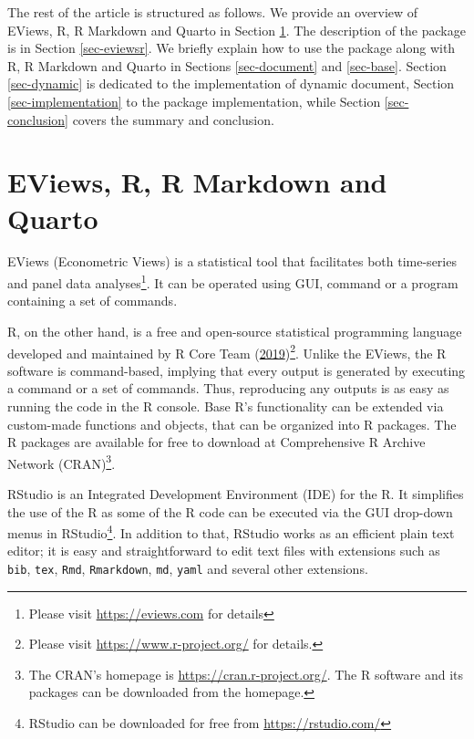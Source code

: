 The rest of the article is structured as follows. We provide an overview of EViews, R, R Markdown and Quarto in Section \ref{sec-tools}. The description of the  package is in Section \ref{sec-eviewsr}. We briefly explain how to use the package along with R, R Markdown and Quarto in Sections \ref{sec-document} and \ref{sec-base}. Section \ref{sec-dynamic} is dedicated to the implementation of dynamic document, Section \ref{sec-implementation} to the package implementation, while Section \ref{sec-conclusion} covers the summary and conclusion.

\hypertarget{sec-tools}{%
\section{EViews, R, R Markdown and Quarto}\label{sec-tools}}

EViews (Econometric Views) is a statistical tool that facilitates both time-series and panel data analyses\footnote{Please visit \url{https://eviews.com} for details}. It can be operated using GUI, command or a program containing a set of commands.

R, on the other hand, is a free and open-source statistical programming language developed and maintained by R Core Team (\protect\hyperlink{ref-R}{2019})\footnote{Please visit \url{https://www.r-project.org/} for details.}. Unlike the EViews, the R software is command-based, implying that every output is generated by executing a command or a set of commands. Thus, reproducing any outputs is as easy as running the code in the R console. Base R's functionality can be extended via custom-made functions and objects, that can be organized into R packages. The R packages are available for free to download at Comprehensive R Archive Network (CRAN)\footnote{The CRAN's homepage is \url{https://cran.r-project.org/}. The R software and its packages can be downloaded from the homepage.}.

RStudio is an Integrated Development Environment (IDE) for the R. It simplifies the use of the R as some of the R code can be executed via the GUI drop-down menus in RStudio\footnote{RStudio can be downloaded for free from \url{https://rstudio.com/}}. In addition to that, RStudio works as an efficient plain text editor; it is easy and straightforward to edit text files with extensions such as \texttt{bib}, \texttt{tex}, \texttt{Rmd}, \texttt{Rmarkdown}, \texttt{md}, \texttt{yaml} and several other extensions.


